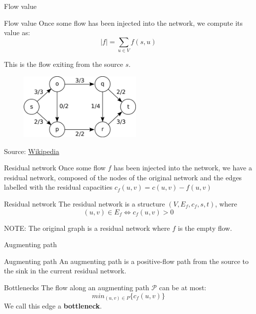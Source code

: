 \documentclass{beamer}
\begin{document}
    \begin{frame}{Flow value}
        \begin{block}{Flow value}
            Once some flow has been injected into the network, we compute its value as:
            $$|f|=\sum_{u\in V} f(s,u)$$
        \end{block}
        This is the flow exiting from the source $s$.
        \begin{figure}[!htb]
            \includegraphics[width=60mm]{maxflow}
        \end{figure}
        \begin{flushright}
        \tiny{Source: \href{https://en.wikipedia.org/wiki/Maximum_flow_problem}{Wikipedia}}
        \end{flushright}
    \end{frame}

    \begin{frame}{Residual network}
        Once some flow $f$ has been injected into the network, we have a residual network, composed
        of the nodes of the original network and the edges labelled with the residual capacities
        $c_f(u,v)=c(u,v)-f(u,v)$
        \begin{block}{Residual network}
            The residual network is a structure $(V,E_f,c_f,s,t)$, where 
            $$(u,v)\in E_f \Leftrightarrow c_f(u,v) > 0$$
        \end{block}
        \alert{NOTE:} The original graph is a residual network where $f$ is the empty flow.
    \end{frame}

    \begin{frame}{Augmenting path}
        \begin{block}{Augmenting path}
            An augmenting path is a positive-flow path from the source to the sink in the
            current residual network.
        \end{block}
        \begin{alertblock}{Bottlenecks}
        The flow along an augmenting path $\mathcal{P}$ can be at most:
        $$min_{(u,v)\in P}\{c_f(u,v)\}$$
        We call this edge a \textbf{bottleneck}.
        \end{alertblock}
    \end{frame}
\end{document}
